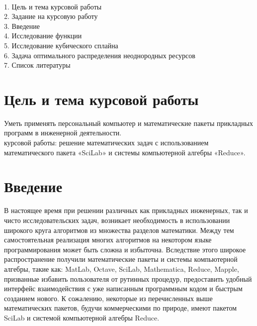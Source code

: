 \documentclass[russian,utf8,nocolumnxxxi,nocolumnxxxii]{eskdtext}
\begin{document}
{}
\\1. Цель и тема курсовой работы
\\2. Задание на курсовую работу
\\3. Введение
\\4. Исследование функции
\\5. Исследование кубического сплайна
\\6. Задача оптимального распределения неоднородных ресурсов
\\7. Список литературы

\newpage
\section{Цель и тема курсовой работы}
 Уметь применять персональный компьютер и математические пакеты прикладных программ в инженерной деятельности.
\\{ курсовой работы:} решение математических задач с использованием математического пакета «SciLab» и системы компьютерной алгебры «Reduce».

\newpage
\section{Введение}
В настоящее время при решении различных как прикладных инженерных, так и чисто исследовательских задач, возникает необходимость в использовании широкого круга алгоритмов из множества разделов математики. Между тем самостоятельная реализация многих алгоритмов на некотором языке программирования может быть сложна и избыточна. Вследствие этого широкое распространение получили математические пакеты и системы компьютерной алгебры, такие как: MatLab, Octave, SciLab, Mathematica, Reduce, Mapple, призванные избавить пользователя от рутинных процедур, предоставить удобный интерфейс взаимодействия с уже написанным программным кодом и быстрым созданием нового. К сожалению, некоторые из перечисленных выше математических пакетов, будучи коммерческими по природе, имеют пакетом SciLab и системой компьютерной алгебры Reduce.

\newpage
\end{document}

